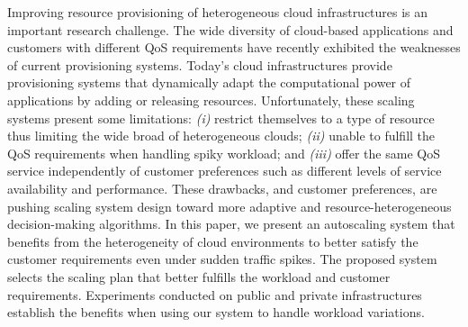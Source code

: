 Improving resource provisioning of heterogeneous cloud infrastructures is an important research challenge. The wide diversity of cloud-based applications and customers with different QoS requirements have recently exhibited the weaknesses of current provisioning systems. Today's cloud infrastructures provide provisioning systems that dynamically adapt the computational power of applications by adding or releasing resources. Unfortunately, these scaling systems present some limitations: \emph{(i)} restrict themselves to a type of resource thus limiting the wide broad of heterogeneous clouds; \emph{(ii)} unable to fulfill the QoS requirements when handling spiky workload; and \emph{(iii)} offer the same QoS service independently of customer preferences such as different levels of service availability and performance. These drawbacks, and customer preferences, are pushing scaling system design toward more adaptive and resource-heterogeneous decision-making algorithms. In this paper, we present an autoscaling system that benefits from the heterogeneity of cloud environments to better satisfy the customer requirements even under sudden traffic spikes. The proposed system selects the scaling plan that better fulfills the workload and customer requirements. Experiments conducted on public and private infrastructures establish the benefits when using our system to handle workload variations.





